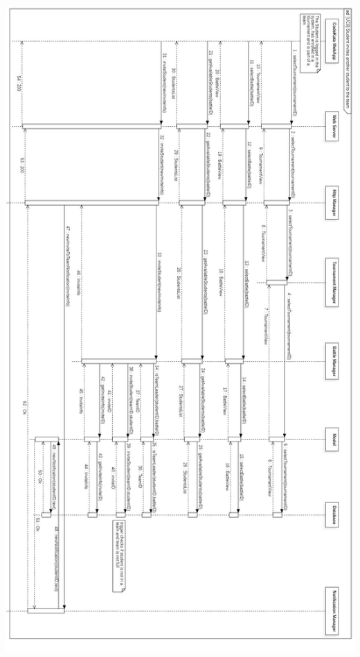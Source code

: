\documentclass{article}
\begin{document}
\newpage
\begin{center}
    \includegraphics[angle=-90,width=0.7\linewidth]{uc9.jpg}
  \label{fig:uc9}
\end{center}
\end{document}
